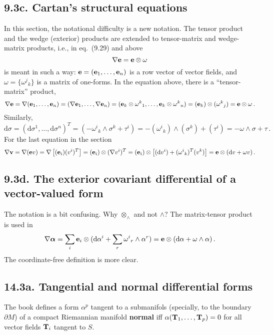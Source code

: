 \documentclass[a4paper,12pt]{article}
\def\d{\mathrm{d}}
\begin{document}
\subsection*{9.3c. Cartan's structural equations}
In this section, the notational difficulty is a new notation. The tensor product and the wedge (exterior) products are extended to tensor-matrix and wedge-matrix products, i.e., in eq.\ (9.29) and above
\[
 \nabla {\bf e} = {\bf e}\otimes \omega
\]
is meant in such a way: ${\bf e} = ({\bf e}_1, \dots, {\bf e}_n)$ is a row vector of vector fields, and
$\omega = \{ \omega^j{}_k\}$ is a matrix of one-forms. In the equation above, there is a ``tensor-matrix'' product,
\[
 \nabla{\bf e} = \nabla ({\bf e}_1, \dots, {\bf e}_n) = (\nabla {\bf e}_1,\dots, \nabla {\bf e}_n) = ({\bf e}_k\otimes \omega^k{}_1,\dots, {\bf e}_k\otimes \omega^k{}_n) = ({\bf e}_k)\otimes (\omega^k{}_j) = {\bf e}\otimes \omega\,.
\]
Similarly,
\[
 \d \sigma = (\d \sigma^1, \dots, \d \sigma^n)^T = (-\omega^i{}_k \wedge \sigma^k + \tau^i) = -(\omega^i{}_k)\wedge (\sigma^k) + (\tau^i) = -\omega\wedge \sigma + \tau\,.
\]
For the last equation in the section
\[
 \nabla {\bf v} = \nabla ({\bf e}v) = \nabla\left[ ({\bf e}_i) (v^i)^T\right] = ({\bf e}_i)\otimes (\nabla v^i)^T = ({\bf e}_i) \otimes \left[(\d v^i) +(\omega^i{}_k)^T (v^k)\right] = {\bf e}\otimes(\d v+\omega v)\,.
\]

\subsection*{9.3d. The exterior covariant differential of a vector-valued form}

The notation is a bit confusing. Why $\otimes_\wedge$ and not $\wedge$? The matrix-tensor product is used in
\[
 \nabla \boldsymbol{\alpha} = \sum_i {\bf e}_i \otimes (\d \alpha^i + \sum_r \omega^i{}_r\wedge \alpha^r) = {\bf e}\otimes(\d\alpha + \omega\wedge\alpha)\,.
\]
The coordinate-free definition is more clear.




\subsection*{14.3a. Tangential and normal differential forms}

The book \cite{Frankel} defines a form $\alpha^p$ tangent to a submanifols (specially, to the boundary $\partial M$) of a compact Riemannian manifold {\bf normal} iff $\alpha({\bf T}_1, \dots, {\bf T}_p)=0$ for all vector fields ${\bf T}_i$ tangent to $S$.
\end{document}
